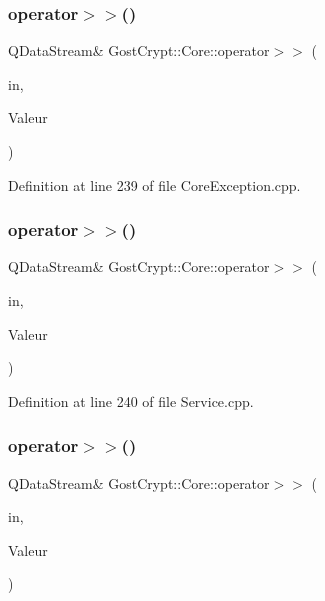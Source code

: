 \subsubsection{\texorpdfstring{operator$>$$>$()}{operator>>()}\hspace{0.1cm}{\footnotesize\ttfamily [45/56]}}
{\footnotesize\ttfamily Q\+Data\+Stream\& Gost\+Crypt\+::\+Core\+::operator$>$$>$ (\begin{DoxyParamCaption}\item[{Q\+Data\+Stream \&}]{in,  }\item[{\hyperlink{class_gost_crypt_1_1_core_1_1_algorithm_not_found}{Gost\+Crypt\+::\+Core\+::\+Algorithm\+Not\+Found} \&}]{Valeur }\end{DoxyParamCaption})}



Definition at line 239 of file Core\+Exception.\+cpp.

\mbox{\label{namespace_gost_crypt_1_1_core_a60ed3f1dfef3922d28a85bcd52fb1edd}} 
\subsubsection{\texorpdfstring{operator$>$$>$()}{operator>>()}\hspace{0.1cm}{\footnotesize\ttfamily [46/56]}}
{\footnotesize\ttfamily Q\+Data\+Stream\& Gost\+Crypt\+::\+Core\+::operator$>$$>$ (\begin{DoxyParamCaption}\item[{Q\+Data\+Stream \&}]{in,  }\item[{\hyperlink{struct_gost_crypt_1_1_core_1_1_progress_update_response}{Progress\+Update\+Response} \&}]{Valeur }\end{DoxyParamCaption})}



Definition at line 240 of file Service.\+cpp.

\mbox{\label{namespace_gost_crypt_1_1_core_a8163c06b1bf4b5cec3b93abea8926ee0}} 
\subsubsection{\texorpdfstring{operator$>$$>$()}{operator>>()}\hspace{0.1cm}{\footnotesize\ttfamily [47/56]}}
{\footnotesize\ttfamily Q\+Data\+Stream\& Gost\+Crypt\+::\+Core\+::operator$>$$>$ (\begin{DoxyParamCaption}\item[{Q\+Data\+Stream \&}]{in,  }\item[{\hyperlink{struct_gost_crypt_1_1_core_1_1_get_derivation_functions_request}{Get\+Derivation\+Functions\+Request} \&}]{Valeur }\end{DoxyParamCaption})}




